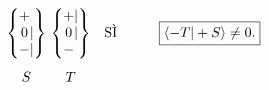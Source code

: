 \documentclass[a4paper,12pt,oneside]{book}
\begin{document}
	\begin{equation}
		\begin{matrix}
		\begin{Bmatrix}
			\makebox[\widthof{$-$}]{$+$}\makebox[\widthof{$|$}]{$\ $} \\ \makebox[\widthof{$-$}]{$0$}|\\ - | 
		\end{Bmatrix} \\[0.7cm]
			S
		\end{matrix} \
		\begin{matrix}
		\begin{Bmatrix}
 			\makebox[\widthof{$-$}]{$+$} | \\ \makebox[\widthof{$-$}]{$0$} | \\ - \makebox[\widthof{$|$}]{$\ $} 
		\end{Bmatrix} & \textrm{SÌ} & \qquad\boxed{\langle -T | +S \rangle \neq 0.} \\[0.7cm]
			T & &
		\end{matrix}
		\label{SG7}
	\end{equation}
\end{document}
